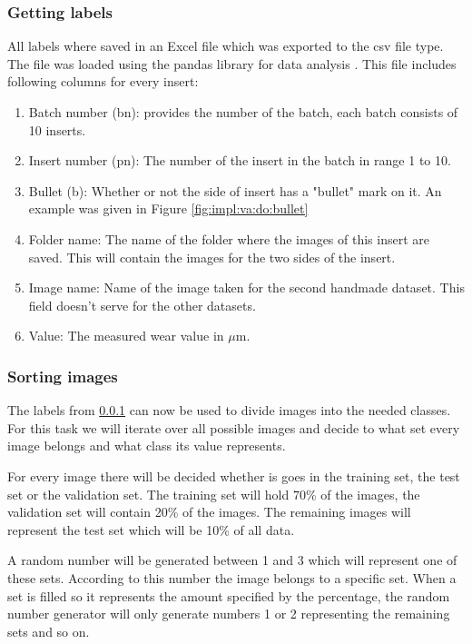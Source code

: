 		\subsubsection{Getting labels}
		\label{sec:impl:va:do:labels}
			All labels where saved in an Excel file which was exported to the csv file type. The file was loaded using the pandas library for data analysis \citep{McKinney2015}. This file includes following columns for every insert:
			\begin{enumerate}
				\item Batch number (bn): provides the number of the batch, each batch consists of 10 inserts.
				\item Insert number (pn): The number of the insert in the batch in range 1 to 10.
				\item Bullet (b): Whether or not the side of insert has a "bullet" mark on it. An example was given in Figure \ref{fig:impl:va:do:bullet}
				\item Folder name: The name of the folder where the images of this insert are saved. This will contain the images for the two sides of the insert.
				\item Image name: Name of the image taken for the second handmade dataset. This field doesn't serve for the other datasets.
				\item Value: The measured wear value in $\mu$m.
			\end{enumerate}
			
		
	
			
		\subsubsection{Sorting images}
			The labels from \ref{sec:impl:va:do:labels} can now be used to divide images into the needed classes. For this task we will iterate over all possible images and decide to what set every image belongs and what class its value represents. 
			
			For every image there will be decided whether is goes in the training set, the test set or the validation set. The training set will hold 70\% of the images, the validation set will contain 20\% of the images. The remaining images will represent the test set which will be 10\% of all data.
			
			A random number will be generated between 1 and 3 which will represent one of these sets. According to this number the image belongs to a specific set. When a set is filled so it represents the amount specified by the percentage, the random number generator will only generate numbers 1 or 2 representing the remaining sets and so on.
			
